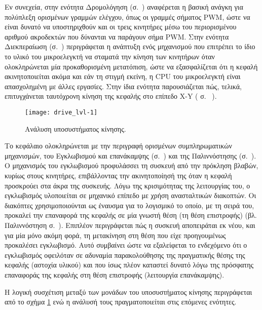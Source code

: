 Εν συνεχεία, στην ενότητα Δρομολόγηση (σ.~\pageref{sec:motor:routing})
αναφέρεται η βασική ανάγκη για πολύπλεξη ορισμένων γραμμών ελέγχου, όπως οι
γραμμές σήματος PWM, ώστε να είναι δυνατό να υποστηριχθούν και οι τρεις
κινητήρες μέσω του περιορισμένου αριθμού ακροδεκτών που δύνανται να παράγουν
σήμα PWM.
Στην ενότητα Διεκπεραίωση (σ.~\pageref{subsec:motor:autoshut}) περιγράφεται η
ανάπτυξη ενός μηχανισμού που επιτρέπει το ίδιο το υλικό του μικροελεγκτή να
σταματά την κίνηση των κινητήρων όταν ολοκληρώνεται μία προκαθορισμένη
μετατόπιση, ώστε να εξασφαλίζεται ότι η κεφαλή ακινητοποιείται ακόμα και εάν τη
στιγμή εκείνη, η CPU του μικροελεγκτή είναι απασχολημένη με άλλες εργασίες.
Στην ίδια ενότητα παρουσιάζεται πώς, τελικά, επιτυγχάνεται ταυτόχρονη κίνηση της
κεφαλής στο επίπεδο X-Y ( σ.~%
\pageref{ssubsec:motor:common-translation}).

\begin{figure}
    \caption{Ανάλυση υποσυστήματος κίνησης.\label{fig:motor:lvl-1}}
    \begin{center}
    \texttt{[image: drive\_lvl-1]}
    \end{center}
\end{figure}

Το κεφάλαιο ολοκληρώνεται με την περιγραφή ορισμένων συμπληρωματικών
μηχανισμών, του Εγκλωβισμού και επανάκαμψης (σ.~\pageref{sec:motor:backtrack})
και της Παλιννόστησης (σ.~\pageref{sec:motor:homing}). Ο μηχανισμός του
εγκλωβισμού προφυλάσσει τη συσκευή
από την πρόκληση βλαβών, κυρίως στους κινητήρες, επιβάλλοντας την ακινητοποίησή
της όταν
η κεφαλή προσκρούει στα άκρα της συσκευής. Λόγω της κρισιμότητας της λειτουργίας
του, ο εγκλωβισμός υλοποιείται σε μηχανικό επίπεδο με χρήση ανασταλτικών
διακοπτών. Οι διακόπτες χρησιμοποιούνται ως έναυσμα για το λογισμικό το οποίο,
με τη σειρά του, προκαλεί την επαναφορά της κεφαλής σε μία γνωστή θέση (τη θέση
επιστροφής) (βλ. Παλιννόστηση σ.~\pageref{sec:motor:homing}).
Επιπλέον περιγράφεται πώς η συσκευή αποπειράται εκ νέου, και για μία μόνο ακόμη
φορά, τη μετακίνηση στη θέση που είχε προηγουμένως προκαλέσει εγκλωβισμό. Αυτό
συμβαίνει ώστε να εξαλείφεται το ενδεχόμενο ότι ο εγκλωβισμός οφειλόταν σε
αδυναμία παρακολούθησης της πραγματικής θέσης της κεφαλής (αστοχία υλικού) και
που ίσως πλέον καταστεί δυνατό λόγω της πρόσφατης επαναφοράς της κεφαλής στη
θέση επιστροφής (λειτουργία επανάκαμψης).

Η λογική συσχέτιση μεταξύ των μονάδων του υποσυστήματος κίνησης περιγράφεται από
το σχήμα \ref{fig:motor:lvl-1} ενώ η ανάλυσή τους πραγματοποιείται στις επόμενες
ενότητες.

